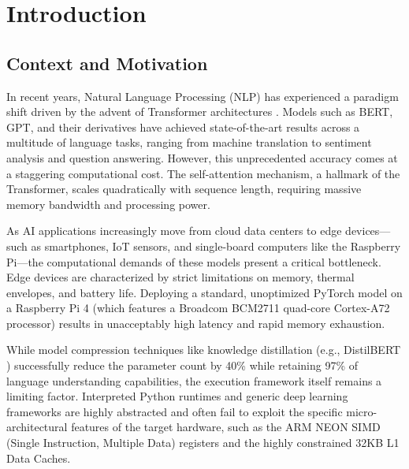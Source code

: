 \chapter{Introduction}
\label{ch:intro}

\section{Context and Motivation}
In recent years, Natural Language Processing (NLP) has experienced a paradigm shift driven by the advent of Transformer architectures \cite{vaswani2017attention}. Models such as BERT, GPT, and their derivatives have achieved state-of-the-art results across a multitude of language tasks, ranging from machine translation to sentiment analysis and question answering. However, this unprecedented accuracy comes at a staggering computational cost. The self-attention mechanism, a hallmark of the Transformer, scales quadratically with sequence length, requiring massive memory bandwidth and processing power.

As AI applications increasingly move from cloud data centers to edge devices—such as smartphones, IoT sensors, and single-board computers like the Raspberry Pi—the computational demands of these models present a critical bottleneck. Edge devices are characterized by strict limitations on memory, thermal envelopes, and battery life. Deploying a standard, unoptimized PyTorch model on a Raspberry Pi 4 (which features a Broadcom BCM2711 quad-core Cortex-A72 processor) results in unacceptably high latency and rapid memory exhaustion.

While model compression techniques like knowledge distillation (e.g., DistilBERT \cite{sanh2019distilbert}) successfully reduce the parameter count by 40\% while retaining 97\% of language understanding capabilities, the execution framework itself remains a limiting factor. Interpreted Python runtimes and generic deep learning frameworks are highly abstracted and often fail to exploit the specific micro-architectural features of the target hardware, such as the ARM NEON SIMD (Single Instruction, Multiple Data) registers and the highly constrained 32KB L1 Data Caches.


